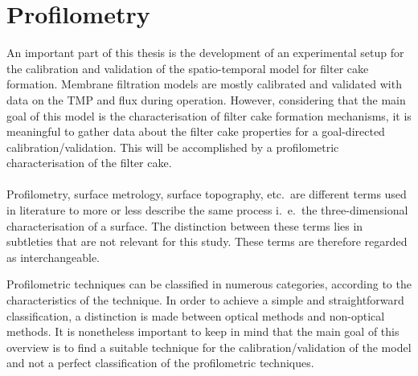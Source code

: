\section{Profilometry}
An important part of this thesis is the development of an experimental setup for the calibration and validation of the spatio-temporal model for filter cake formation. %
Membrane filtration models are mostly calibrated and validated with data on the \gls{TMP} and flux during operation. However, considering that the main goal of this model is the characterisation of filter cake formation mechanisms, it is meaningful to gather data about the filter cake properties for a goal-directed calibration/validation. This will be accomplished by a profilometric characterisation of the filter cake. \\ \\ 
Profilometry, surface metrology, surface topography, etc.\ are different terms used in literature to more or less describe the same process i.\ e.\ the three-dimensional characterisation of a surface. The distinction between these terms lies in subtleties that are not relevant for this study. These terms are therefore regarded as interchangeable. \par
Profilometric techniques can be classified in numerous categories, according to the characteristics of the technique. In order to achieve a simple and straightforward classification, a distinction is made between optical methods and non-optical methods. It is nonetheless important to keep in mind that the main goal of this overview is to find a suitable technique for the calibration/validation of the model and not a perfect classification of the profilometric techniques.

